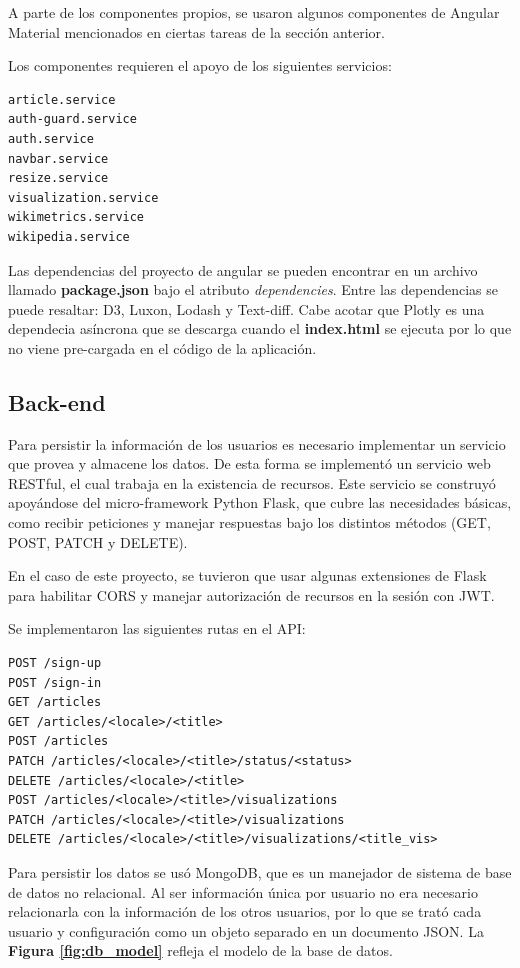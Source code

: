 A parte de los componentes propios, se usaron algunos componentes de Angular Material mencionados en ciertas tareas de la sección anterior.

Los componentes requieren el apoyo de los siguientes servicios:
\begin{verbatim}
article.service
auth-guard.service
auth.service
navbar.service
resize.service
visualization.service
wikimetrics.service
wikipedia.service
\end{verbatim}

Las dependencias del proyecto de angular se pueden encontrar en un archivo llamado \textbf{package.json} bajo el atributo \textit{dependencies}. Entre las dependencias se puede resaltar: D3, Luxon, Lodash y Text-diff. Cabe acotar que Plotly es una dependecia asíncrona que se descarga cuando el \textbf{index.html} se ejecuta por lo que no viene pre-cargada en el código de la aplicación.

\subsection{Back-end}
Para persistir la información de los usuarios es necesario implementar un servicio que provea y almacene los datos. De esta forma se implementó un servicio web RESTful, el cual trabaja en la existencia de recursos. Este servicio se construyó apoyándose del micro-framework Python Flask, que cubre las necesidades básicas, como recibir peticiones y manejar respuestas bajo los distintos métodos (GET, POST, PATCH y DELETE).

En el caso de este proyecto, se tuvieron que usar algunas extensiones de Flask para habilitar CORS y manejar autorización de recursos en la sesión con JWT.

Se implementaron las siguientes rutas en el API:
\begin{verbatim}
POST /sign-up
POST /sign-in
GET /articles
GET /articles/<locale>/<title>
POST /articles
PATCH /articles/<locale>/<title>/status/<status>
DELETE /articles/<locale>/<title>
POST /articles/<locale>/<title>/visualizations
PATCH /articles/<locale>/<title>/visualizations
DELETE /articles/<locale>/<title>/visualizations/<title_vis>
\end{verbatim}

Para persistir los datos se usó MongoDB, que es un manejador de sistema de base de datos no relacional. Al ser información única por usuario no era necesario relacionarla con la información de los otros usuarios, por lo que se trató cada usuario y configuración como un objeto separado en un documento JSON. La \textbf{Figura \ref{fig:db_model}} refleja el modelo de la base de datos.

